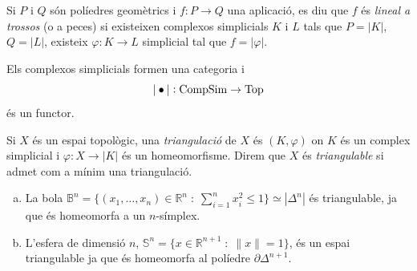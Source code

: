 \documentclass[../main.tex]{subfiles}
\begin{document}
\begin{defi}
Si $P$ i $Q$ són políedres geomètrics i $f:P\rightarrow Q$ una aplicació, es diu que $f$ és \textit{lineal a trossos} (o a peces) si existeixen complexos simplicials $K$ i $L$ tals que $P = |K|$, $Q = |L|$, existeix $\varphi:K\rightarrow L$ simplicial tal que $f =|\varphi|$.
\end{defi}

\begin{nota}
Els complexos simplicials formen una categoria i
\begin{equation}
    \notag
    |\bullet|:\mathrm{CompSim}\rightarrow\mathrm{Top}
\end{equation}
és un functor.
\end{nota}


\begin{defi}
[Triangulació] Si $X$ és un espai topològic, una \textit{triangulació} de $X$ és $(K,\varphi)$ on $K$ és un complex simplicial i $\varphi:X\rightarrow|K|$ és un homeomorfisme. Direm que $X$ és \textit{triangulable} si admet com a mínim una triangulació.
\end{defi}


\begin{ej}
\begin{enumerate}[(a)]
    \item La bola $\mathbb{B}^n = \{(x_1,\ldots,x_n)\in\mathbb{R}^n\;:\;\sum_{i=1}^n x_i^2\leq 1\}\simeq |\Delta^n|$ és triangulable, ja que és homeomorfa a un $n$-símplex.
    \item L'esfera de dimensió $n$, $\mathbb{S}^n = \{x\in\mathbb{R}^{n+1}\;:\;\|x\|=1\}$, és un espai triangulable ja que és homeomorfa al políedre $\partial\Delta^{n+1}$.
\end{enumerate}
\end{ej}



\end{document}
